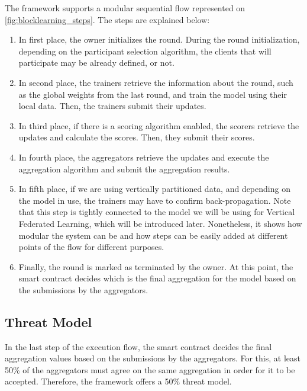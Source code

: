 The framework supports a modular sequential flow represented on \autoref{fig:blocklearning_steps}. The steps are explained below:

\begin{enumerate}
    \item In first place, the owner initializes the round. During the round initialization, depending on the participant selection algorithm, the clients that will participate may be already defined, or not.
    
    \item In second place, the trainers retrieve the information about the round, such as the global weights from the last round, and train the model using their local data. Then, the trainers submit their updates.
    
    \item In third place, if there is a scoring algorithm enabled, the scorers retrieve the updates and calculate the scores. Then, they submit their scores.
    
    \item In fourth place, the aggregators retrieve the updates and execute the aggregation algorithm and submit the aggregation results.
    
    \item In fifth place, if we are using vertically partitioned data, and depending on the model in use, the trainers may have to confirm back-propagation. Note that this step is tightly connected to the model we will be using for Vertical Federated Learning, which will be introduced later. Nonetheless, it shows how modular the system can be and how steps can be easily added at different points of the flow for different purposes.
    
    \item Finally, the round is marked as terminated by the owner. At this point, the smart contract decides which is the final aggregation for the model based on the submissions by the aggregators.
\end{enumerate}

\subsection{Threat Model}

In the last step of the execution flow, the smart contract decides the final aggregation values based on the submissions by the aggregators. For this, at least 50\% of the aggregators must agree on the same aggregation in order for it to be accepted. Therefore, the framework offers a 50\% threat model.

